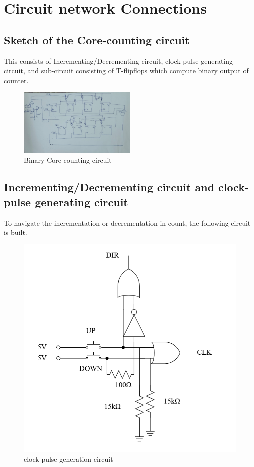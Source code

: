 \documentclass[a4paper,12pt]{article}
\begin{document}
\section{Circuit network Connections}

\subsection{Sketch of the Core-counting circuit}
This consists of Incrementing/Decrementing circuit, clock-pulse generating circuit, and sub-circuit consisting of T-flipflops which compute binary output of counter.
\begin{figure}[H]
    \centering
    \includegraphics[width=0.5\textwidth]{ckt.png} %
    \caption{Binary Core-counting circuit}
    \label{fig:my_label}
\end{figure}

\subsection{Incrementing/Decrementing circuit and clock-pulse generating circuit}
To navigate the incrementation or decrementation in count, the following circuit is built.

\begin{figure}[h!]
    \centering
    \includegraphics[width=\textwidth]{navi.png}
    \caption{clock-pulse generation circuit}
    \label{fig:image_label}
\end{figure}
\end{document}
